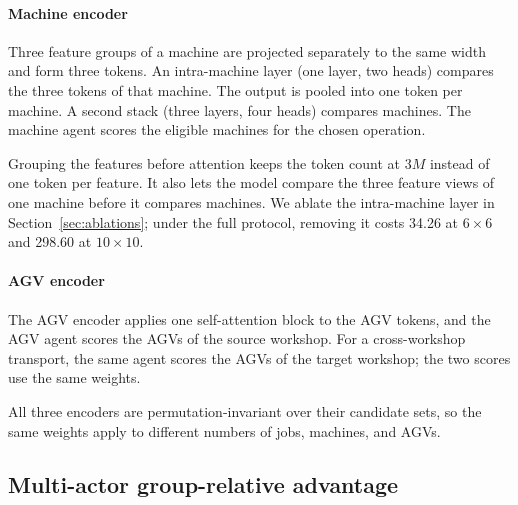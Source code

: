 \paragraph{Machine encoder}
Three feature groups of a machine are projected separately to the same
width and form three tokens. An intra-machine layer (one layer, two heads)
compares the three tokens of that machine. The output is
pooled into one token per machine. A second stack (three layers, four
heads) compares machines. The machine agent scores the
eligible machines for the chosen operation.

Grouping the features before attention keeps the token count at $3M$ instead
of one token per feature. It also lets the model compare the three feature
views of one machine before it compares machines. We ablate the intra-machine
layer in Section~\ref{sec:ablations}; under the full protocol, removing it costs
34.26 at $6\times6$ and 298.60 at $10\times10$.

\paragraph{AGV encoder}
The AGV encoder applies one self-attention block to the AGV tokens, and the
AGV agent scores the AGVs of the source workshop. For a cross-workshop
transport, the same agent scores the AGVs of the target workshop; the two
scores use the same weights.

All three encoders are permutation-invariant over their candidate sets, so
the same weights apply to different numbers of jobs, machines, and AGVs.

\subsection{Multi-actor group-relative advantage}

